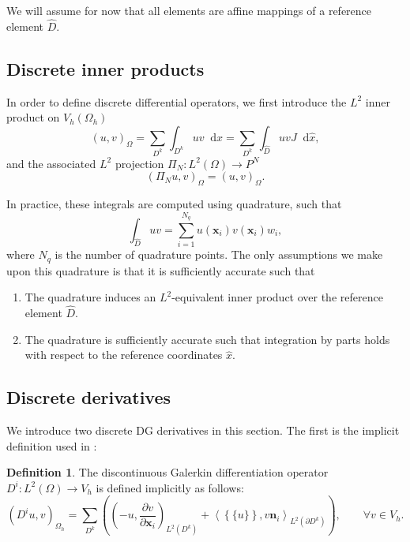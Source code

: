 \documentclass[preprint,10pt]{article}
\theoremstyle{definition}
\newtheorem{definition}{Definition}
\theoremstyle{lemma}
\newcommand{\pd}[2]{\frac{\partial#1}{\partial#2}}
\newcommand{\LRp}[1]{\left( #1 \right)}
\newcommand{\LRa}[1]{\left\langle #1 \right\rangle}
\newcommand{\LRc}[1]{\left\{ #1 \right\}}
\newcommand{\avg}[1] {\ensuremath{\LRc{\!\{#1\}\!}}}
\newcommand{\Oh}{{\Omega_h}}
\newcommand{\LK}{L^2\LRp{D^k}}
\newcommand{\LdK}{L^2\LRp{\partial D^k}}
\newcommand*\diff[1]{\mathop{}\!{\mathrm{d}#1}}
\begin{document}
We will assume for now that all elements are affine mappings of a reference element $\widehat{D}$.  

\subsection{Discrete inner products}

In order to define discrete differential operators, we first introduce the $L^2$ inner product on $V_h\LRp{\Oh}$
\[
\LRp{u,v}_{\Omega} = \sum_{D^k} \int_{D^k} uv \diff{x} = \sum_{D^k} \int_{\widehat{D}} uv J \diff{\widehat{x}},
\]
and the associated $L^2$ projection $\Pi_N: L^2\LRp{\Omega}\rightarrow P^N$
\[
\LRp{\Pi_N u,v}_{\Omega} = \LRp{u,v}_{\Omega}.  
\]

In practice, these integrals are computed using quadrature, such that 
\begin{equation}
\int_{\widehat{D}}uv = \sum_{i=1}^{N_q} u(\bm{x}_i)v(\bm{x}_i) w_i,
\label{eq:quad}
\end{equation}
where $N_q$ is the number of quadrature points.  The only assumptions we make upon this quadrature is that it is sufficiently accurate such that 
\begin{enumerate}
\item The quadrature induces an $L^2$-equivalent inner product over the reference element $\widehat{D}$.
\item The quadrature is sufficiently accurate such that integration by parts holds with respect to the reference coordinates $\widehat{x}$.
\end{enumerate}


\subsection{Discrete derivatives}
We introduce two discrete DG derivatives in this section.  The first is the implicit definition used in \cite{di2011mathematical}:
\begin{definition}
The discontinuous Galerkin differentiation operator ${D}^i: L^2\LRp{\Omega}\rightarrow V_h$ is defined implicitly as follows:
\[
\LRp{{D}^i u,v}_{\Oh} = \sum_{D^k} \LRp{\LRp{-u,\pd{v}{\bm{x}_i}}_{\LK} + \LRa{\avg{u},v\bm{n}_i}_{\LdK}}, \qquad \forall v \in V_h.
\]
\end{definition}
\end{document}
